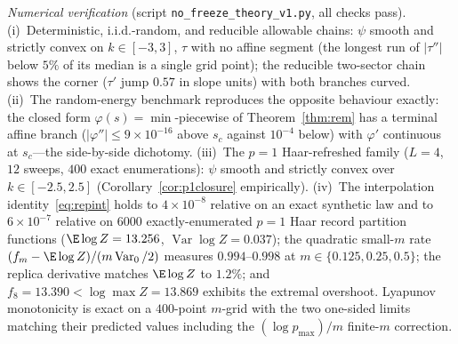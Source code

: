 \emph{Numerical verification} (script \texttt{no\_freeze\_theory\_v1.py},
all checks pass).  (i)~Deterministic, i.i.d.-random, and reducible
allowable chains: $\psi$ smooth and strictly convex on
$k\in[-3,3]$, $\tau$ with no affine segment (the longest run of
$|\tau''|$ below $5\%$ of its median is a single grid point); the
reducible two-sector chain shows the corner ($\tau'$ jump $0.57$ in slope
units) with both branches curved.  (ii)~The random-energy benchmark
reproduces the opposite behaviour exactly: the closed form
$\varphi(s)=\min$-piecewise of Theorem~\ref{thm:rem} has a terminal
affine branch ($|\varphi''|\le9\times10^{-16}$ above $s_c$ against
$10^{-4}$ below) with $\varphi'$ continuous at $s_c$---the side-by-side
dichotomy.  (iii)~The $p=1$ Haar-refreshed family ($L=4$, $12$ sweeps,
$400$ exact enumerations): $\psi$ smooth and strictly convex over
$k\in[-2.5,2.5]$ (Corollary~\ref{cor:p1closure} empirically).  (iv)~The
interpolation identity~\eqref{eq:repint} holds to $4\times10^{-8}$
relative on an exact synthetic law and to $6\times10^{-7}$ relative on
$6000$ exactly-enumerated $p=1$ Haar record partition functions
($\E\log Z=13.256$, $\operatorname{Var}\log Z=0.037$); the quadratic small-$m$ rate
$(f_m-\E\log Z)/(m\operatorname{Var}_0/2)$ measures $0.994$--$0.998$ at
$m\in\{0.125,0.25,0.5\}$; the replica derivative matches $\E\log Z$ to
$1.2\%$; and $f_8=13.390<\log\max Z=13.869$ exhibits the extremal
overshoot.  Lyapunov monotonicity is exact on a $400$-point $m$-grid with
the two one-sided limits matching their predicted values including the
$(\log p_{\max})/m$ finite-$m$ correction.
